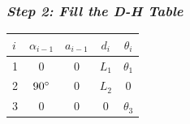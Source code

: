 \documentclass[10pt]{article}
\begin{document}
\subsubsection*{\textit{\textbf{Step 2: Fill the D-H Table}}}
\begin{center}
\begin{tabular}{ l | c c c c }
  $i$ & $\alpha_{i-1}$ & $a_{i-1}$ & $d_{i}$ & $\theta_{i}$\\
  \hline
  1   & $0$            & $0$       & $L_{1}$ & $\theta_{1}$\\ 
  2   & $90\degree$    & $0$       & $L_{2}$ & $0$         \\
  3   & $0$            & $0$       & $0$     & $\theta_{3}$\\
\end{tabular}
\end{center}
\end{document}
